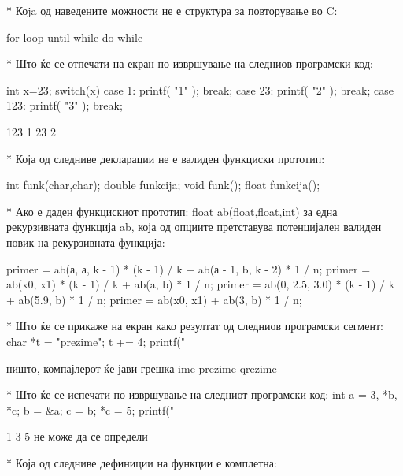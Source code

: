 * Коja од наведените можности не е структура за повторување во C:

for
loop until
while
do while

* Што ќе се отпечати на екран по извршување на следниов програмски код:

int x=23;
switch(x) {
  case 1: printf( "1" ); break;
  case 23: printf( "2" ); break;
  case 123: printf( "3" ); break;
}

123
1
23
2

* Која од следниве декларации не е валиден функциски прототип:

int funk(char,char);
double funkcija;
void funk();
float funkcija();

* Ако е даден функцискиот прототип: float ab(float,float,int) за една
рекурзивната функција ab, која од опциите претставува потенцијален валиден повик на рекурзивната функција:

    primer = ab(а, а, k - 1) * (k - 1) / k + ab(а - 1, b, k - 2) * 1 / n;
    primer = ab(x0, x1) * (k - 1) / k + ab(a, b) * 1 / n;
    primer = ab(0, 2.5, 3.0) * (k - 1) / k + ab(5.9, b) * 1 / n;
    primer = ab(x0, x1) + ab(3, b) * 1 / n;

* Што ќе се прикаже на екран како резултат од следниов програмски сегмент:      
    char *t = "prezime";
    t += 4;
    printf("%

ништо, компајлерот ќе јави грешка
ime
prezime
qrezime


* Што ќе се испечати по извршување на следниот програмски код:
    int a = 3, *b, *c;
    b = &a;
    c = b;
    *c = 5;
    printf("%

1
3
5
не може да се определи

* Која од следниве дефиниции на функции е комплетна:

